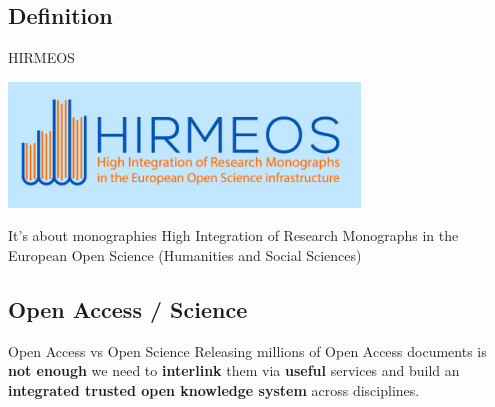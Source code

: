 \documentclass[xcolor=svgnames]{beamer}
\begin{document}
    \subsection{Definition}


        \begin{frame}{HIRMEOS}
            \begin{center}
                \includegraphics[width=0.7\textwidth]{img/hirmeos}
                \color{black}
                \begin{block}{It's about monographies}
                    High Integration of Research Monographs in the European Open Science (Humanities and Social Sciences)
                \end{block}
            \end{center}
        \end{frame}

    \subsection{Open Access / Science}

        \begin{frame}{Open Access vs Open Science}
            Releasing millions of Open Access documents is \textbf{not enough}
            \pause
            we need to \textbf{interlink} them
            \pause
            via \textbf{useful} services
            \pause
            and build an \textbf{integrated trusted open knowledge system} across disciplines.
        \end{frame}
\end{document}

